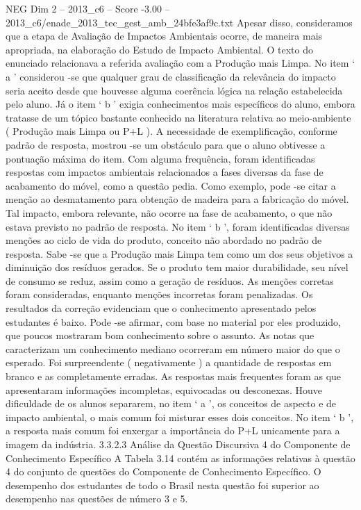\begin{textsample}{NEG Dim 2 – 2013\_c6 – Score -3.00 – 2013\_c6/enade\_2013\_tec\_gest\_amb\_24bfe3af9c.txt}
Apesar disso, consideramos que a etapa de Avaliação de Impactos Ambientais ocorre, de maneira mais apropriada, na elaboração do Estudo de Impacto Ambiental.
O texto do enunciado relacionava a referida avaliação com a Produção mais Limpa.
No item ‘ a ’ considerou -se que qualquer grau de classificação da relevância do impacto seria aceito desde que houvesse alguma coerência lógica na relação estabelecida pelo aluno.
Já o item ‘ b ’ exigia conhecimentos mais específicos do aluno, embora tratasse de um tópico bastante conhecido na literatura relativa ao meio-ambiente ( Produção mais Limpa ou P+L ).
A necessidade de exemplificação, conforme padrão de resposta, mostrou -se um obstáculo para que o aluno obtivesse a pontuação máxima do item.
Com alguma frequência, foram identificadas respostas com impactos ambientais relacionados a fases diversas da fase de acabamento do móvel, como a questão pedia.
Como exemplo, pode -se citar a menção ao desmatamento para obtenção de madeira para a fabricação do móvel.
Tal impacto, embora relevante, não ocorre na fase de acabamento, o que não estava previsto no padrão de resposta.
No item ‘ b ’, foram identificadas diversas menções ao ciclo de vida do produto, conceito não abordado no padrão de resposta.
Sabe -se que a Produção mais Limpa tem como um dos seus objetivos a diminuição dos resíduos gerados.
Se o produto tem maior durabilidade, seu nível de consumo se reduz, assim como a geração de resíduos.
As menções corretas foram consideradas, enquanto menções incorretas foram penalizadas.
Os resultados da correção evidenciam que o conhecimento apresentado pelos estudantes é baixo.
Pode -se afirmar, com base no material por eles produzido, que poucos mostraram bom conhecimento sobre o assunto.
As notas que caracterizam um conhecimento mediano ocorreram em número maior do que o esperado.
Foi surpreendente ( negativamente ) a quantidade de respostas em branco e as completamente erradas.
As respostas mais frequentes foram as que apresentaram informações incompletas, equivocadas ou desconexas.
Houve dificuldade de os alunos separarem, no item ‘ a ’, os conceitos de aspecto e de impacto ambiental, o mais comum foi misturar esses dois conceitos.
No item ‘ b ’, a resposta mais comum foi enxergar a importância do P+L unicamente para a imagem da indústria. 3.3.2.3 Análise da Questão Discursiva 4 do Componente de Conhecimento Específico A Tabela 3.14 contém as informações relativas à questão 4 do conjunto de questões do Componente de Conhecimento Específico.
O desempenho dos estudantes de todo o Brasil nesta questão foi superior ao desempenho nas questões de número 3 e 5.

\end{textsample}
